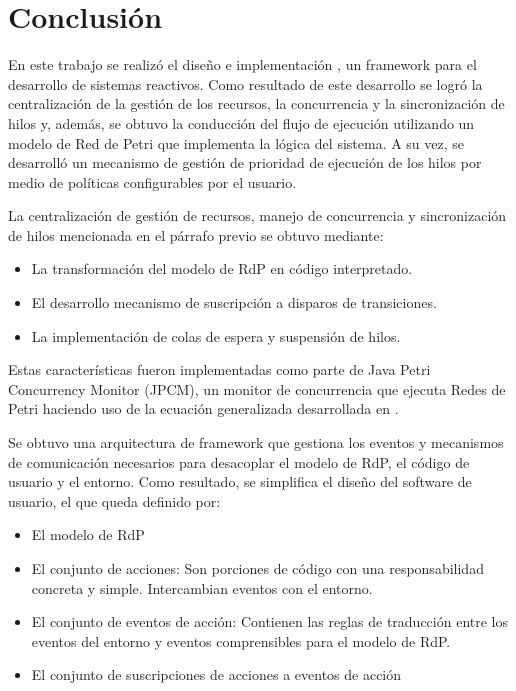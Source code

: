 \section{Conclusión}

En este trabajo se realizó el diseño e implementación
\textit{\nombreFramework}, un framework para el desarrollo de sistemas
reactivos. Como resultado de este desarrollo se logró la centralización de la
gestión de los recursos, la concurrencia y la sincronización de hilos y,
además, se obtuvo la conducción del flujo de ejecución utilizando un modelo de
Red de Petri que implementa la lógica del sistema. A su vez, se desarrolló un
mecanismo de gestión de prioridad de ejecución de los hilos por medio de
políticas configurables por el usuario.

La centralización de gestión de recursos, manejo de concurrencia y
sincronización de hilos mencionada en el párrafo previo se obtuvo mediante:
\begin{itemize}
 \item La transformación del modelo de RdP en código interpretado.

 \item El desarrollo mecanismo de suscripción a disparos de transiciones.

 \item La implementación de colas de espera y suspensión de hilos.
\end{itemize}

Estas características fueron implementadas como parte de Java Petri Concurrency
 Monitor (JPCM), un monitor de concurrencia que ejecuta Redes de Petri haciendo
 uso de la ecuación generalizada desarrollada en
 \cite{Ecuacion_generalizada_LAC}.

Se obtuvo una arquitectura de framework que gestiona los eventos y mecanismos
de comunicación necesarios para desacoplar el modelo de RdP, el código de
usuario y el entorno.
Como resultado, se simplifica el diseño del software de usuario, el que queda
definido por:

\begin{itemize}
    \item El modelo de RdP
    \item El conjunto de acciones: Son porciones de código con una
    responsabilidad concreta y simple. Intercambian eventos con el entorno.
    \item El conjunto de eventos de acción: Contienen las reglas de traducción
    entre los eventos del entorno y eventos comprensibles para el modelo de
    RdP.
    \item El conjunto de suscripciones de acciones a eventos de acción
\end{itemize}

